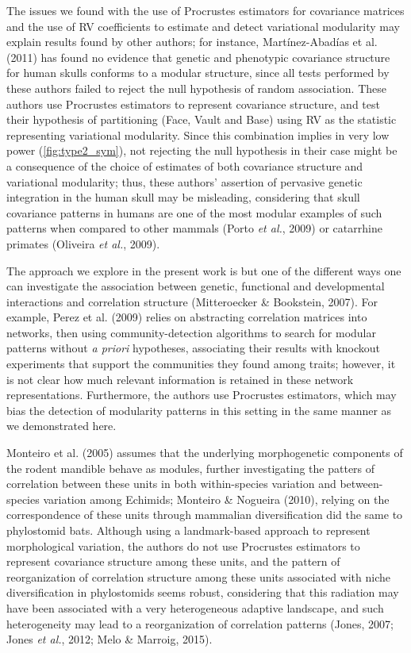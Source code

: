 \documentclass[12pt,twoside]{report}
\begin{document}
The issues we found with the use of Procrustes estimators for covariance
matrices and the use of RV coefficients to estimate and detect
variational modularity may explain results found by other authors; for
instance, Martínez-Abadías et al. (2011) has found no evidence that
genetic and phenotypic covariance structure for human skulls conforms to
a modular structure, since all tests performed by these authors failed
to reject the null hypothesis of random association. These authors use
Procrustes estimators to represent covariance structure, and test their
hypothesis of partitioning (Face, Vault and Base) using RV as the
statistic representing variational modularity. Since this combination
implies in very low power (\autoref{fig:type2_sym}), not rejecting the
null hypothesis in their case might be a consequence of the choice of
estimates of both covariance structure and variational modularity; thus,
these authors' assertion of pervasive genetic integration in the human
skull may be misleading, considering that skull covariance patterns in
humans are one of the most modular examples of such patterns when
compared to other mammals (Porto \emph{et al.}, 2009) or catarrhine
primates (Oliveira \emph{et al.}, 2009).

The approach we explore in the present work is but one of the different
ways one can investigate the association between genetic, functional and
developmental interactions and correlation structure (Mitteroecker \&
Bookstein, 2007). For example, Perez et al. (2009) relies on abstracting
correlation matrices into networks, then using community-detection
algorithms to search for modular patterns without \emph{a priori}
hypotheses, associating their results with knockout experiments that
support the communities they found among traits; however, it is not
clear how much relevant information is retained in these network
representations. Furthermore, the authors use Procrustes estimators,
which may bias the detection of modularity patterns in this setting in
the same manner as we demonstrated here.

Monteiro et al. (2005) assumes that the underlying morphogenetic
components of the rodent mandible behave as modules, further
investigating the patters of correlation between these units in both
within-species variation and between-species variation among Echimids;
Monteiro \& Nogueira (2010), relying on the correspondence of these
units through mammalian diversification did the same to phylostomid
bats. Although using a landmark-based approach to represent
morphological variation, the authors do not use Procrustes estimators to
represent covariance structure among these units, and the pattern of
reorganization of correlation structure among these units associated
with niche diversification in phylostomids seems robust, considering
that this radiation may have been associated with a very heterogeneous
adaptive landscape, and such heterogeneity may lead to a reorganization
of correlation patterns (Jones, 2007; Jones \emph{et al.}, 2012; Melo \&
Marroig, 2015).
\end{document}
